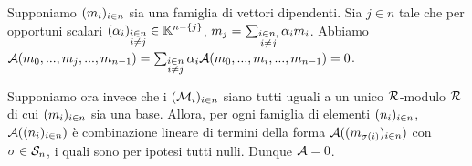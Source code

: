 \Proof Supponiamo $(m_i)_{i \in n}$ sia una famiglia di vettori dipendenti. Sia $j \in n$ tale che per opportuni scalari $(\alpha_i)_{\substack{i \in n\\i \neq j}} \in \mathbb{K}^{n - \lbrace j \rbrace}$, $m_j = \sum_{\substack{i \in n,\\ i \neq j}} \alpha_i m_i$. Abbiamo $\mathcal{A}(m_0, ..., m_j, ..., m_{n - 1}) = \sum_{\substack{i \in n\\i \neq j}} \alpha_i \mathcal{A}(m_0, ..., m_i, ..., m_{n - 1}) = 0$.
\par Supponiamo ora invece che i $(\mathcal{M}_i)_{i \in n}$ siano tutti uguali a un unico $\mathcal{R}$-modulo $\mathcal{R}$ di cui $(m_i)_{i \in n}$ sia una base. Allora, per ogni famiglia di elementi $(n_i)_{i \in n}$, $\mathcal{A}((n_i)_{i \in n})$ \`e combinazione lineare di termini della forma $\AlternatingForm((\ModuleElement_{\Permutation(i)})_{i \in n})$ con $\Permutation \in \SymmetricGroup{n}$, i quali sono per ipotesi tutti nulli. Dunque $\mathcal{A} = 0$. \EndProof
